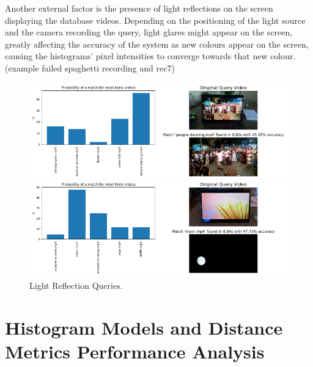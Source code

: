 Another external factor is the presence of light reflections on the screen displaying the database videos. Depending on the positioning of the light source and the camera recording the query, light glares might appear on the screen, greatly affecting the accuracy of the system as new colours appear on the screen, causing the histograms' pixel intensities to converge towards that new colour. (example failed spaghetti recording and rec7)

\begin{figure}[h] 
\centerline{\includegraphics[width=\textwidth]{figures/evaluation/light-reflection-queries.png}}
\caption{\label{fig:evaluation-light-reflection-queries}Light Reflection Queries.}
\end{figure}


\section{Histogram Models and Distance Metrics Performance Analysis}

